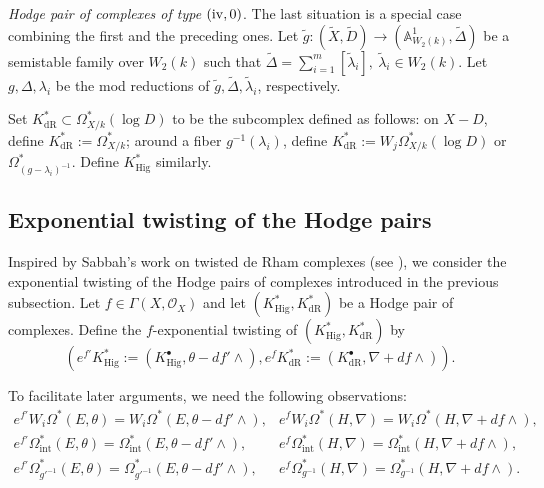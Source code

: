 \documentclass[12pt, a4paper]{article}
\begin{document}
\emph{Hodge pair of complexes of type $(\mathrm{\uppercase\expandafter{\romannumeral4}},0)$}. The last situation is a special case combining the first and the preceding ones. Let $\tilde{g}: (\tilde{X},\tilde D) \to (\mathbb{A}^1_{W_2(k)},\tilde\Delta)$ be a semistable family over $W_2(k)$ such that $\tilde\Delta=\sum_{i=1}^m[\tilde \lambda_i],~\tilde\lambda_i\in W_2(k)$. Let $g,\Delta,\lambda_i$ be the mod reductions of $\tilde g,\tilde\Delta,\tilde\lambda_i$, respectively. 

Set $K^*_{\mathrm{dR}} \subset \Omega^*_{X/k}(\log D)$ to be the subcomplex defined as follows: on $X-D$, define $K^*_{\mathrm{dR}} := \Omega^*_{X/k}$; around a fiber $g^{-1}(\lambda_i)$, define $K^*_{\mathrm{dR}} := W_j\Omega^*_{X/k}(\log D)$ or $\Omega^*_{(g - \lambda_i)^{-1}}$. Define $K^*_{\mathrm{Hig}}$ similarly.



\subsection{Exponential twisting of the Hodge pairs}
Inspired by Sabbah's work on twisted de Rham complexes (see \cite{Sah1}), we consider the exponential twisting of the Hodge pairs of complexes introduced in the previous subsection. Let $f\in\Gamma(X,\mathcal O_X)$ and let $(K^*_\mathrm{Hig},K^*_\mathrm{dR})$ be a Hodge pair of complexes. Define the $f$-exponential twisting of $(K^*_\mathrm{Hig},K^*_\mathrm{dR})$ by
$$
(e^{f'}K^*_\mathrm{Hig}:=(K^\bullet_\mathrm{Hig},\theta-df'\wedge),e^fK^*_\mathrm{dR}:=(K^\bullet_\mathrm{dR},\nabla+df\wedge)).
$$

To facilitate later arguments, we need the following observations:
$$
\begin{array}{cc}
     e^{f'}W_i\Omega^*(E,\theta)=W_i\Omega^*(E,\theta-df'\wedge),
     & e^fW_i\Omega^*(H,\nabla)=W_i\Omega^*(H,\nabla+df\wedge),\\
e^{f'}\Omega^*_\mathrm{int}(E,\theta)=\Omega^*_\mathrm{int}(E,\theta-df'\wedge),&e^f\Omega^*_\mathrm{int}(H,\nabla)=\Omega^*_\mathrm{int}(H,\nabla+df\wedge), \\
e^{f'}\Omega^*_{g'^{-1}}(E,\theta)=\Omega^*_{g'^{-1}}(E,\theta-df'\wedge),&e^f\Omega^*_{g^{-1}}(H,\nabla)=\Omega^*_{g^{-1}}(H,\nabla+df\wedge). 

\end{array}
$$
\end{document}
